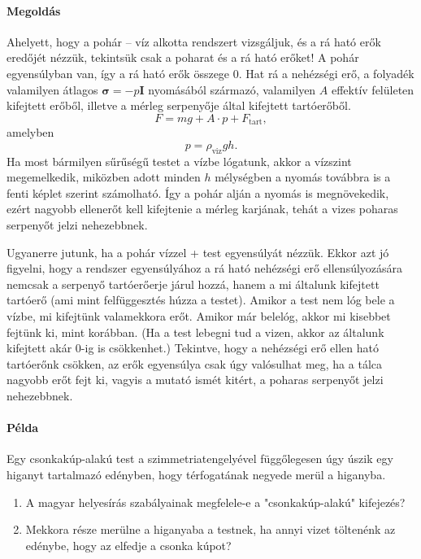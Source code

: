 \documentclass[12pt,a4paper]{scrartcl}
\let\mathbf\bm
\begin{document}
\paragraph{Megoldás}
Ahelyett, hogy a pohár -- víz alkotta rendszert vizsgáljuk, és a rá ható erők eredőjét nézzük, tekintsük csak a poharat és a rá ható erőket! A pohár egyensúlyban van, így a rá ható erők összege 0. Hat rá a nehézségi erő, a folyadék valamilyen átlagos ${\mathbf{\sigma }} =  - p{\mathbf{ I}}$ nyomásából származó, valamilyen $A$ effektív felületen kifejtett erőből, illetve a mérleg serpenyője által kifejtett tartóerőből.
\[F = mg + A \cdot p + {F_{{\text{tart}}}},\]
amelyben
\[p = {\rho _{{\text{viz}}}}gh.\]
Ha most bármilyen sűrűségű testet a vízbe lógatunk, akkor a vízszint megemelkedik, miközben adott minden $h$ mélységben a nyomás továbbra is a fenti képlet szerint számolható. Így a pohár alján a nyomás is megnövekedik, ezért nagyobb ellenerőt kell kifejtenie a mérleg karjának, tehát a vizes poharas serpenyőt jelzi nehezebbnek.

Ugyanerre jutunk, ha a pohár vízzel + test egyensúlyát nézzük. Ekkor azt jó figyelni, hogy a rendszer egyensúlyához a rá ható nehézségi erő ellensúlyozására nemcsak a serpenyő tartóerőerje járul hozzá, hanem a mi általunk kifejtett tartóerő (ami mint felfüggesztés húzza a testet). Amikor a test nem lóg bele a vízbe, mi kifejtünk valamekkora erőt. Amikor már belelóg, akkor mi kisebbet fejtünk ki, mint korábban. (Ha a test lebegni tud a vizen, akkor az általunk kifejtett akár 0-ig is csökkenhet.) Tekintve, hogy a nehézségi erő ellen ható tartóerőnk csökken, az erők egyensúlya csak úgy valósulhat meg, ha a tálca nagyobb erőt fejt ki, vagyis a mutató ismét kitért, a poharas serpenyőt jelzi nehezebbnek.

\paragraph{Példa}
Egy csonkakúp-alakú test a szimmetriatengelyével függőlegesen úgy úszik egy higanyt tartalmazó edényben, hogy térfogatának negyede merül a higanyba.
\begin{enumerate}
\item A magyar helyesírás szabályainak megfelele-e a "csonkakúp-alakú" kifejezés?
\item Mekkora része merülne a higanyaba a testnek, ha annyi vizet töltenénk az  edénybe, hogy az elfedje a csonka kúpot?
\end{enumerate}
\end{document}
